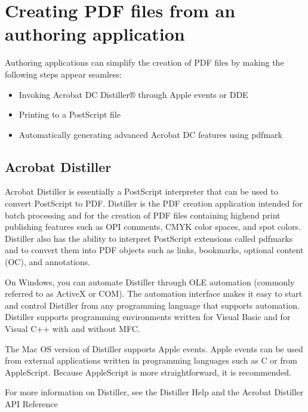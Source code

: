 \documentclass[letterpaper,12pt,english,openany,oneside]{sphinxmanual}
\begin{document}
\section{Creating PDF files from an authoring application}
\label{\detokenize{Overview_PDFCreation:creating-pdf-files-from-an-authoring-application}}
Authoring applications can simplify the creation of PDF files by making the following steps appear seamless:
\begin{itemize}
\item {} 
Invoking Acrobat DC Distiller® through Apple events or DDE

\item {} 
Printing to a PostScript file

\item {} 
Automatically generating advanced Acrobat DC features using pdfmark

\end{itemize}




\subsection{Acrobat Distiller}
\label{\detokenize{Overview_PDFCreation:acrobat-distiller}}
Acrobat Distiller is essentially a PostScript interpreter that can be used to convert PostScript to PDF. Distiller is the PDF creation application intended for batch processing and for the creation of PDF files containing high\sphinxhyphen{}end print publishing features such as OPI comments, CMYK color spaces, and spot colors. Distiller also has the ability to interpret PostScript extensions called pdfmarks and to convert them into PDF objects such as links, bookmarks, optional content (OC), and annotations.

On Windows, you can automate Distiller through OLE automation (commonly referred to as ActiveX or COM). The automation interface makes it easy to start and control Distiller from any programming language that supports automation. Distiller supports programming environments written for Visual Basic and for Visual C++ with and without MFC.

The Mac OS version of Distiller supports Apple events. Apple events can be used from external applications written in programming languages such as C or from AppleScript. Because AppleScript is more straightforward, it is recommended.

For more information on Distiller, see the Distiller Help and the Acrobat Distiller API Reference
\end{document}
